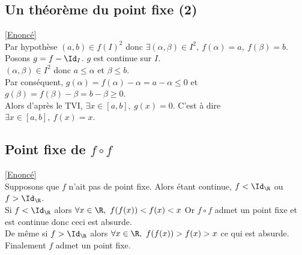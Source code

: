 \documentclass{book}
\begin{document}
	\subsection{Un théorème du point fixe (2) }
	\label{Un théorème du point fixe (2) corrigé}
	\textcolor{blue}{\hyperref[Un théorème du point fixe (2)]{[Enoncé]}}\\
	Par hypothèse $(a,b)\in f(I)^2$ donc $\exists (\alpha,\beta)\in I^2,\ f(\alpha)=a,\ f(\beta)=b$.\\
	Posons $g=f-\Id_I$. $g$ est continue sur $I$.\\
	$(\alpha,\beta)\in I^2$ donc $a\leq \alpha$ et $\beta\leq b$.\\
	Par conséquent, $g(\alpha)=f(\alpha)-\alpha=a-\alpha\leq 0$ et $g(\beta)=f(\beta)-\beta=b-\beta\geq 0$.\\
	Alors d'après le TVI, $\exists x\in [a,b],\ g(x)=0$. C'est à dire $\exists x\in [a,b],\ f(x)=x$.
	
	\subsection{Point fixe de $f\circ f$ }
	\label{Point fixe de fof corrigé}
	\textcolor{blue}{\hyperref[Point fixe de fof]{[Enoncé]}}\\
	Supposons que $f$ n'ait pas de point fixe. Alors étant continue, $f<\Id_\R$ ou $f>\Id_\R$.\\
	Si $f<\Id_\R$ alors $\forall x\in \R,\ f(f(x))<f(x)<x$ Or $f\circ f$ admet un point fixe et est continue donc ceci est absurde.\\
	De même si $f>\Id_\R$ alors $\forall x\in \R,\ f(f(x))>f(x)>x$ ce qui est absurde.\\
	Finalement $f$ admet un point fixe.
	
\end{document}
